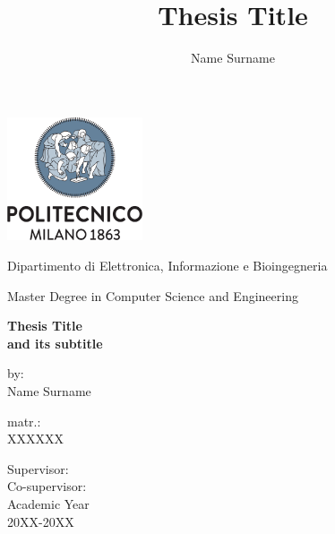 \documentclass[oneside]{book}
\author{Name Surname}
\title{Thesis Title}
\begin{document}
\centering
\includegraphics[width=4cm]{../pictures/logo_archetype_vertical}

\vspace{1cm}
Dipartimento di Elettronica, Informazione e Bioingegneria

\vspace{0.25cm}
Master Degree in Computer Science and Engineering

\vspace{2cm}
\centering

\color{BrickRed}
\Huge
\textbf{
Thesis Title \\%
\Large and its subtitle}

\normalsize
\vspace{2cm}
\color{black}
\flushright
by:\\Name Surname

\vspace{0.5cm}
matr.:\\XXXXXX

\vspace{0.5cm}
\flushleft
Supervisor:\\

\vspace{0.5cm}
Co-supervisor:\\



\vfill
\centering
Academic Year \\ 20XX-20XX

\end{document}
